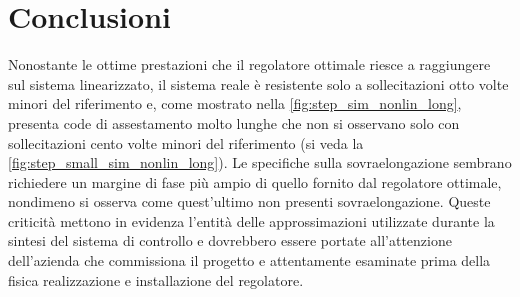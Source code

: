\documentclass[a4paper]{article}
\begin{document}
\section{Conclusioni}
Nonostante le ottime prestazioni che il regolatore ottimale riesce a raggiungere sul sistema linearizzato, il sistema reale è resistente solo a sollecitazioni otto volte minori del riferimento e, come mostrato nella \cref{fig:step_sim_nonlin_long}, presenta code di assestamento molto lunghe che non si osservano solo con sollecitazioni cento volte minori del riferimento (si veda la \cref{fig:step_small_sim_nonlin_long}).
Le specifiche sulla sovraelongazione sembrano richiedere un margine di fase più ampio di quello fornito dal regolatore ottimale, nondimeno si osserva come quest'ultimo non presenti sovraelongazione.
Queste criticità mettono in evidenza l'entità delle approssimazioni utilizzate durante la sintesi del sistema di controllo e dovrebbero essere portate all'attenzione dell'azienda che commissiona il progetto e attentamente esaminate prima della fisica realizzazione e installazione del regolatore.
\end{document}
